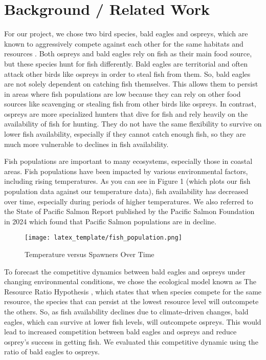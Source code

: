 \documentclass{article}
\begin{document}
\section{Background / Related Work}
For our project, we chose two bird species, bald eagles and ospreys, which are known to aggressively compete against each other for the same habitats and resources \cite{b1}. Both ospreys and bald eagles rely on fish as their main food source, but these species hunt for fish differently. Bald eagles are territorial and often attack other birds like ospreys in order to steal fish from them. So, bald eagles are not solely dependent on catching fish themselves. This allows them to persist in areas where fish populations are low because they can rely on other food sources like scavenging or stealing fish from other birds like ospreys. In contrast, ospreys are more specialized hunters that dive for fish and rely heavily on the availability of fish for hunting. They do not have the same flexibility to survive on lower fish availability, especially if they cannot catch enough fish, so they are much more vulnerable to declines in fish availability. 

Fish populations are important to many ecosystems, especially those in coastal areas. Fish populations have been impacted by various environmental factors, including rising temperatures. As you can see in Figure 1 (which plots our fish population data against our temperature data), fish availability has decreased over time, especially during periods of higher temperatures. We also referred to the State of Pacific Salmon Report published by the Pacific Salmon Foundation in 2024 \cite{b2} which found that Pacific Salmon populations are in decline. 

\begin{figure}[htbp]
\centerline{\texttt{[image: latex\_template/fish\_population.png]}}
\caption{Temperature versus Spawners Over Time}
\label{fig}
\end{figure} 

To forecast the competitive dynamics between bald eagles and ospreys under changing environmental conditions, we chose the ecological model known as The Resource Ratio Hypothesis \cite{b3}, which states that when species compete for the same resource, the species that can persist at the lowest resource level will outcompete the others. So, as fish availability declines due to climate-driven changes, bald eagles, which can survive at lower fish levels, will outcompete ospreys. This would lead to increased competition between bald eagles and ospreys and reduce osprey’s success in getting fish. We evaluated this competitive dynamic using the ratio of bald eagles to ospreys. 
\end{document}
